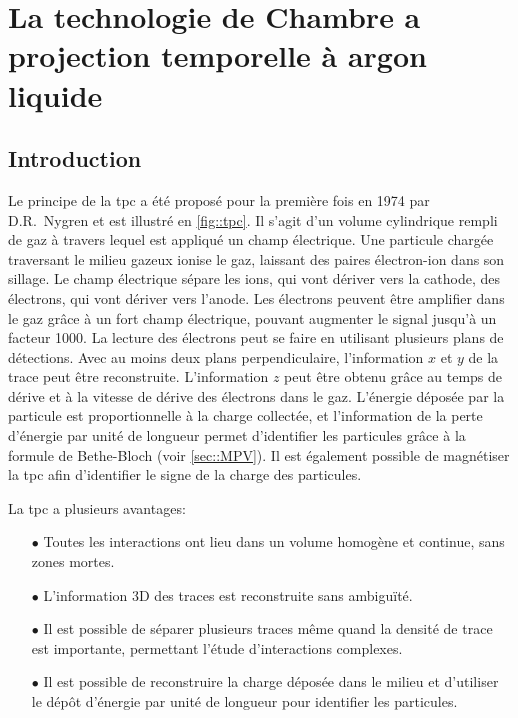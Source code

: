 
\chapter{La technologie de Chambre a projection temporelle à argon liquide}

    
  \section{Introduction}
    Le principe de la \acrfull{tpc} a été proposé pour la première fois en 1974 par D.R.~Nygren\cite{Nygren1974} et est illustré en \autoref{fig::tpc}. Il s'agit d'un volume cylindrique rempli de gaz à travers lequel est appliqué un champ électrique. Une particule chargée traversant le milieu gazeux ionise le gaz, laissant des paires électron-ion dans son sillage. Le champ électrique sépare les ions, qui vont dériver vers la cathode, des électrons, qui vont dériver vers l'anode. Les électrons peuvent être amplifier dans le gaz grâce à un fort champ électrique, pouvant augmenter le signal jusqu'à un facteur 1000. La lecture des électrons peut se faire en utilisant plusieurs plans de détections. Avec au moins deux plans perpendiculaire, l'information $x$ et $y$ de la trace peut être reconstruite. L'information $z$ peut être obtenu grâce au temps de dérive et à la vitesse de dérive des électrons dans le gaz. L'énergie déposée par la particule est proportionnelle à la charge collectée, et l'information de la perte d'énergie par unité de longueur permet d'identifier les particules grâce à la formule de Bethe-Bloch (voir \autoref{sec::MPV}). Il est également possible de magnétiser la \gls{tpc} afin d'identifier le signe de la charge des particules.

    La \gls{tpc} a plusieurs avantages:
    \begin{itemize}
      \item[$\bullet$] Toutes les interactions ont lieu dans un volume homogène et continue, sans zones mortes.
      \item[$\bullet$] L'information 3D des traces est reconstruite sans ambiguïté.
      \item[$\bullet$] Il est possible de séparer plusieurs traces même quand la densité de trace est importante, permettant l'étude d'interactions complexes.
      \item[$\bullet$] Il est possible de reconstruire la charge déposée dans le milieu et d'utiliser le dépôt d'énergie par unité de longueur pour identifier les particules.
    \end{itemize}
    
